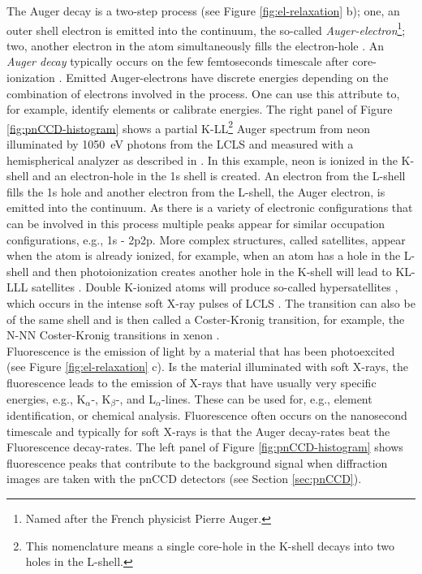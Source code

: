 The Auger decay is a two-step process (see Figure \ref{fig:el-relaxation} b); one, an outer shell electron is emitted into the continuum, the so-called \textit{Auger-electron}\footnote{Named after the French physicist Pierre Auger.}; two, another electron in the atom simultaneously fills the electron-hole \citep{schmidt-1997}. An \textit{Auger decay} typically occurs on the few femtoseconds timescale after core-ionization \citep{Buth-2003-JCP}. Emitted Auger-electrons have discrete energies depending on the combination of electrons involved in the process. One can use this attribute to, for example, identify elements or calibrate energies. The right panel of Figure \ref{fig:pnCCD-histogram} shows a partial K-LL\footnote{This nomenclature means a single core-hole in the K-shell decays into two holes in the L-shell.} Auger spectrum from neon illuminated by \SI{1050}{\electronvolt} photons from the LCLS and measured with a hemispherical analyzer as described in \citep{Bucher-2014-Unpublished}. In this example, neon is ionized in the K-shell and an electron-hole in the 1s shell is created. An electron from the L-shell fills the 1s hole and another electron from the L-shell, the Auger electron, is emitted into the continuum. As there is a variety of electronic configurations that can be involved in this process multiple peaks appear for similar occupation configurations, e.g., 1s - 2p2p. More complex structures, called satellites, appear when the atom is already ionized, for example, when an atom has a hole in the L-shell and then photoionization creates another hole in the K-shell will lead to KL-LLL satellites \citep{schmidt-1997}. Double K-ionized atoms will produce so-called hypersatellites \citep{Briand-1971-PRL}, which occurs in the intense soft X-ray pulses of LCLS \citep{Berrah-2011-PNAS}. The transition can also be of the same shell and is then called a Coster-Kronig transition, for example, the N-NN Coster-Kronig transitions in xenon \citep{Coster-1935-Physica}.\\[1\baselineskip]
%
Fluorescence is the emission of light by a material that has been photoexcited (see Figure \ref{fig:el-relaxation} c). Is the material illuminated with soft X-rays, the fluorescence leads to the emission of X-rays that have usually very specific energies, e.g., K$_\alpha$-, K$_\beta$-, and L$_\alpha$-lines. These can be used for, e.g., element identification, or chemical analysis. Fluorescence often occurs on the nanosecond timescale \citep{Berezin-2011-ChemRev} and typically for soft X-rays is that the Auger decay-rates beat the Fluorescence decay-rates. The left panel of Figure \ref{fig:pnCCD-histogram} shows fluorescence peaks that contribute to the background signal when diffraction images are taken with the pnCCD detectors (see Section \ref{sec:pnCCD}).\\[1\baselineskip]
